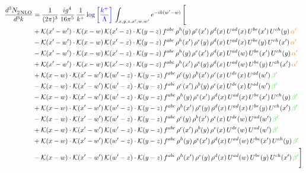 \documentclass[9pt]{article}
\numberwithin{equation}{section}
\begin{document}
\begin{align}
  \frac{d^{3}N_{2\,\rm NLO}^{\rm}}{d^{3}k}  & = \frac{1}{(2\pi)^{3}}\, \frac{ig^{4}}{16\pi^{5}}\, \frac{1}{k^{+}}\, {\color{blue}\log{\left[\frac{k^{+}}{\Lambda}\right]}}\, \int_{x,y,z,x^{\prime},w,w^{\prime}}e^{-ik(w^{\prime}-w)}\, \Bigg[\notag \\ &   +\mathcal{K}(x'-w')\cdot\mathcal{K}(x-w)\,\mathcal{K}(x'-z)\cdot\mathcal{K}(y-z)\, f^{abc}\,\rho^{h}(y)\,\rho^{e}(x')\,\rho^{d}(x)\,U^{ad}(x)\,U^{be}(x')\,U^{ch}(y)\,{\color{orange}\alpha'}\notag\\ &-\mathcal{K}(x'-w')\cdot\mathcal{K}(x-w)\,\mathcal{K}(x'-z)\cdot\mathcal{K}(y-z)\, f^{abc}\,\rho^{h}(x')\,\rho^{e}(y)\,\rho^{d}(x)\,U^{ad}(x)\,U^{be}(y)\,U^{ch}(x')\,{\color{orange}\alpha'}\notag\\ &-\mathcal{K}(x'-w')\cdot\mathcal{K}(x-w)\,\mathcal{K}(x'-z)\cdot\mathcal{K}(y-z)\, f^{abc}\,\rho^{h}(y)\,\rho^{e}(x')\,\rho^{d}(x)\,U^{ad}(w)\,U^{be}(x')\,U^{ch}(y)\,{\color{orange}\alpha'}\notag \\ &+\mathcal{K}(x'-w')\cdot\mathcal{K}(x-w)\,\mathcal{K}(x'-z)\cdot\mathcal{K}(y-z)\, f^{abc}\,\rho^{h}(x')\,\rho^{e}(y)\,\rho^{d}(x)\,U^{ad}(w)\,U^{be}(y)\,U^{ch}(x')\,{\color{orange}\alpha'}\notag \\ & +\mathcal{K}(x-w)\cdot\mathcal{K}(x'-w')\,\mathcal{K}(w'-z)\cdot\mathcal{K}(y-z)\, f^{abc}\,\rho^{c}(y)\,\rho^{b}(x')\,\rho^{e}(x)\,U^{de}(x)\,U^{ad}(w')\,{\color{green}\beta'}\notag \\ &-\mathcal{K}(x-w)\cdot\mathcal{K}(x'-w')\,\mathcal{K}(w'-z)\cdot\mathcal{K}(y-z)\, f^{abc}\,\rho^{c}(x')\,\rho^{b}(y)\,\rho^{e}(x)\,U^{de}(x)\,U^{ad}(w')\,{\color{green}\beta'}\notag \\ & -\mathcal{K}(x-w)\cdot\mathcal{K}(x'-w')\,\mathcal{K}(w'-z)\cdot\mathcal{K}(y-z)\, f^{abc}\,\rho^{h}(y)\,\rho^{e}(x')\,\rho^{d}(x)\,U^{ad}(x)\,U^{be}(x')\,U^{ch}(y)\,{\color{green}\beta'}\notag\\ &+\mathcal{K}(x-w)\cdot\mathcal{K}(x'-w')\,\mathcal{K}(w'-z)\cdot\mathcal{K}(y-z)\, f^{abc}\,\rho^{h}(x')\,\rho^{e}(y)\,\rho^{d}(x)\,U^{ad}(x)\,U^{be}(y)\,U^{ch}(x')\,{\color{green}\beta'}\notag\\ &-\mathcal{K}(x-w)\cdot\mathcal{K}(x'-w')\,\mathcal{K}(w'-z)\cdot\mathcal{K}(y-z)\, f^{abc}\,\rho^{c}(y)\,\rho^{b}(x')\,\rho^{e}(x)\,U^{de}(w)\,U^{ad}(w')\,{\color{green}\beta'}\notag\\ &+\mathcal{K}(x-w)\cdot\mathcal{K}(x'-w')\,\mathcal{K}(w'-z)\cdot\mathcal{K}(y-z)\, f^{abc}\,\rho^{c}(x')\,\rho^{b}(y)\,\rho^{e}(x)\,U^{de}(w)\,U^{ad}(w')\,{\color{green}\beta'}\notag\\ &+\mathcal{K}(x-w)\cdot\mathcal{K}(x'-w')\,\mathcal{K}(w'-z)\cdot\mathcal{K}(y-z)\, f^{abc}\,\rho^{h}(y)\,\rho^{e}(x')\,\rho^{d}(x)\,U^{ad}(w)\,U^{be}(x')\,U^{ch}(y)\,{\color{green}\beta'}\notag \\ &-\mathcal{K}(x-w)\cdot\mathcal{K}(x'-w')\,\mathcal{K}(w'-z)\cdot\mathcal{K}(y-z)\, f^{abc}\,\rho^{h}(x')\,\rho^{e}(y)\,\rho^{d}(x)\,U^{ad}(w)\,U^{be}(y)\,U^{ch}(x')\,{\color{green}\beta'}\Bigg]
\end{align}  
\end{document}
